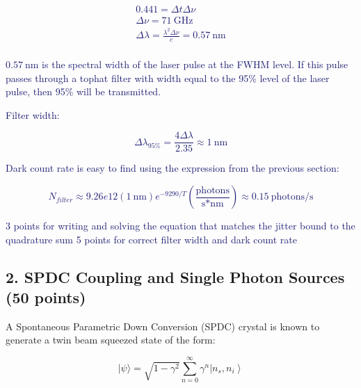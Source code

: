 \documentclass[11pt]{caltech_thesis} %
\begin{document}
\begin{enumerate}
{  }

  \textcolor{midnightblue}{

  $$\begin{aligned}
   0.441 = \Delta t \Delta \nu \\
   \Delta \nu = 71~\text{GHz} \\
   \Delta \lambda = \frac{\lambda^2 \Delta \nu}{c} = 0.57~\text{nm} \\
   \end{aligned}$$

  }

  \textcolor{midnightblue}{ $0.57~\text{nm}$ is the spectral width of the laser pulse at the FWHM level. If this pulse passes through a tophat filter with width equal to the 95\% level of the laser pulse, then 95\% will be transmitted. }

  \textcolor{midnightblue}{Filter width: }

  \textcolor{midnightblue}{

  $$\Delta \lambda_{95\%} = \frac{4 \Delta \lambda}{2.35} \approx \boxed{1~\text{nm}} $$

  }

  \textcolor{midnightblue}{Dark count rate is easy to find using the expression from the previous section: }

  \textcolor{midnightblue}{

  $$\boxed{N_{filter} \approx 9.26e12 (1~\text{nm}) e^{-9290/T} (\frac{\text{photons}}{\text{s*nm}})} \approx 0.15~\text{photons/s} $$

  }

  \textcolor{midnightblue}{3 points for writing and solving the equation that matches the jitter bound to the quadrature sum }
  \textcolor{midnightblue}{5 points for correct filter width and dark count rate}
\end{enumerate}

\hypertarget{spdc-coupling-and-single-photon-sources-50-points}{%
\subsection{2. SPDC Coupling and Single Photon Sources (50 points)}\label{spdc-coupling-and-single-photon-sources-50-points}}

A Spontaneous Parametric Down Conversion (SPDC) crystal is known to generate a twin beam squeezed state of the form:

$$|\psi\rangle= \sqrt{1 - \gamma^2} \sum_{n=0}^{\infty} \gamma^{n}\left|n_{s}, n_{i}\right\rangle $$
\end{document}
